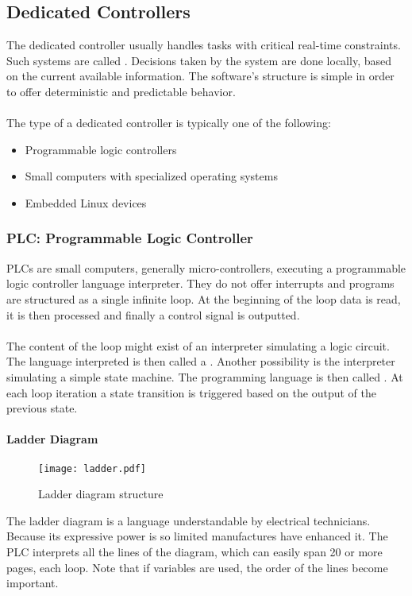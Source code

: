 \documentclass[../main.tex]{subfiles}
\begin{document}
\subsection{Dedicated Controllers}
The dedicated controller usually handles tasks with critical real-time constraints. Such systems are called . Decisions taken by the system are done locally, based on the current available information. The software's structure is simple in order to offer deterministic and predictable behavior.
\\\\
The type of a dedicated controller is typically one of the following:
\begin{itemize}
	\item Programmable logic controllers
	\item Small computers with specialized operating systems
	\item Embedded Linux devices
\end{itemize}

\subsubsection{PLC: Programmable Logic Controller}
PLCs are small computers, generally micro-controllers, executing a programmable logic controller language interpreter. They do not offer interrupts and programs are structured as a single infinite loop. At the beginning of the loop data is read, it is then processed and finally a control signal is outputted.
\\\\
The content of the loop might exist of an interpreter simulating a logic circuit. The language interpreted is then called a . Another possibility is the interpreter simulating a simple state machine. The programming language is then called . At each loop iteration a state transition is triggered based on the output of the previous state.

\paragraph{Ladder Diagram}
\begin{figure}[H]
    \centering
    \texttt{[image: ladder.pdf]}
    \caption{Ladder diagram structure}
    \label{ladderdiagram}
\end{figure}
The ladder diagram is a language understandable by electrical technicians. Because its expressive power is so limited manufactures have enhanced it. The PLC interprets all the lines of the diagram, which can easily span 20 or more pages, each loop. Note that if variables are used, the order of the lines become important.
\end{document}
